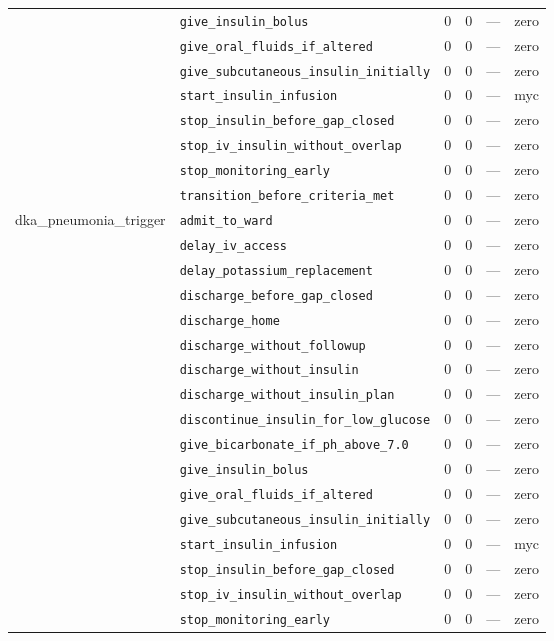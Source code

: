 \begin{table}[ht]
\begin{tabular}{llrrrl}
 & \texttt{give\_insulin\_bolus} & 0 & 0 & — & zero \\
 & \texttt{give\_oral\_fluids\_if\_altered} & 0 & 0 & — & zero \\
 & \texttt{give\_subcutaneous\_insulin\_initially} & 0 & 0 & — & zero \\
 & \texttt{start\_insulin\_infusion} & 0 & 0 & — & myc \\
 & \texttt{stop\_insulin\_before\_gap\_closed} & 0 & 0 & — & zero \\
 & \texttt{stop\_iv\_insulin\_without\_overlap} & 0 & 0 & — & zero \\
 & \texttt{stop\_monitoring\_early} & 0 & 0 & — & zero \\
 & \texttt{transition\_before\_criteria\_met} & 0 & 0 & — & zero \\
\midrule
dka\_pneumonia\_trigger & \texttt{admit\_to\_ward} & 0 & 0 & — & zero \\
 & \texttt{delay\_iv\_access} & 0 & 0 & — & zero \\
 & \texttt{delay\_potassium\_replacement} & 0 & 0 & — & zero \\
 & \texttt{discharge\_before\_gap\_closed} & 0 & 0 & — & zero \\
 & \texttt{discharge\_home} & 0 & 0 & — & zero \\
 & \texttt{discharge\_without\_followup} & 0 & 0 & — & zero \\
 & \texttt{discharge\_without\_insulin} & 0 & 0 & — & zero \\
 & \texttt{discharge\_without\_insulin\_plan} & 0 & 0 & — & zero \\
 & \texttt{discontinue\_insulin\_for\_low\_glucose} & 0 & 0 & — & zero \\
 & \texttt{give\_bicarbonate\_if\_ph\_above\_7.0} & 0 & 0 & — & zero \\
 & \texttt{give\_insulin\_bolus} & 0 & 0 & — & zero \\
 & \texttt{give\_oral\_fluids\_if\_altered} & 0 & 0 & — & zero \\
 & \texttt{give\_subcutaneous\_insulin\_initially} & 0 & 0 & — & zero \\
 & \texttt{start\_insulin\_infusion} & 0 & 0 & — & myc \\
 & \texttt{stop\_insulin\_before\_gap\_closed} & 0 & 0 & — & zero \\
 & \texttt{stop\_iv\_insulin\_without\_overlap} & 0 & 0 & — & zero \\
 & \texttt{stop\_monitoring\_early} & 0 & 0 & — & zero \\

\end{tabular}
\end{table}
